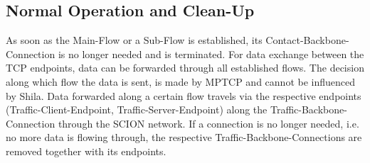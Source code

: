 \subsection{Normal Operation and Clean-Up}
\label{subsec:ShilaCleanUp}

As soon as the Main-Flow or a Sub-Flow is established, its Contact-Backbone-Connection is no longer needed and is terminated. For data exchange between the TCP endpoints, data can be forwarded through all established flows. The decision along which flow the data is sent, is made by MPTCP and cannot be influenced by Shila. Data forwarded along a certain flow travels via the respective endpoints (Traffic-Client-Endpoint, Traffic-Server-Endpoint) along the Traffic-Backbone-Connection through the SCION network.  If a connection is no longer needed, i.e. no more data is flowing through, the respective Traffic-Backbone-Connections are removed together with its endpoints.
